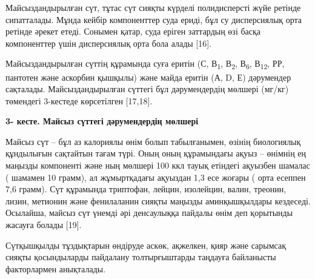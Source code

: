 {Майсыздандырылған сүт, тұтас сүт сияқты күрделі полидисперсті жүйе
ретінде сипатталады. Мұнда кейбір компоненттер суда ериді, бұл су
дисперсиялық орта ретінде әрекет етеді. Сонымен қатар, суда еріген
заттардың өзі басқа компоненттер үшін дисперсиялық орта бола алады
{[}16{]}.

Майсыздандырылған сүттің құрамында суға еритін (С, В\textsubscript{1},
В\textsubscript{2}, В\textsubscript{6}, В\textsubscript{12}, РР,
пантотен және аскорбин қышқылы) және майда еритін (А, D, Е) дәрумендер
сақталады. Майсыздандырылған сүттегі бұл дәрумендердің мөлшері (мг/кг)
төмендегі 3-кестеде көрсетілген {[}17,18{]}.

{\bfseries 3- кесте. Майсыз сүттегі дәрумендердің мөлшері}


Майсыз сүт -- бұл аз калориялы өнім болып табылғанымен, өзінің
биологиялық құндылығын сақтайтын тағам түрі. Оның оның құрамындағы ақуыз
-- өнімнің ең маңызды компоненті және ның мөлшері 100 ккл тауық етіндегі
ақуызбен шамалас ( шамамен 10 грамм), ал жұмыртқадағы ақуыздан 1,3 есе
жоғары ( орта есеппен 7,6 грамм). Сүт құрамында триптофан, лейцин,
изолейцин, валин, треонин, лизин, метионин және фенилаланин сияқты
маңызды аминқышқылдары кездеседі. Осылайша, майсыз сүт үнемді әрі
денсаулыққа пайдалы өнім деп қорытынды жасауға болады {[}19{]}.

Сүтқышқылды тұздықтарын өндіруде аскөк, ақжелкен, қияр және сарымсақ
сияқты қосындыларды пайдалану толтырғыштарды таңдауға байланысты
факторлармен анықталады.

}
